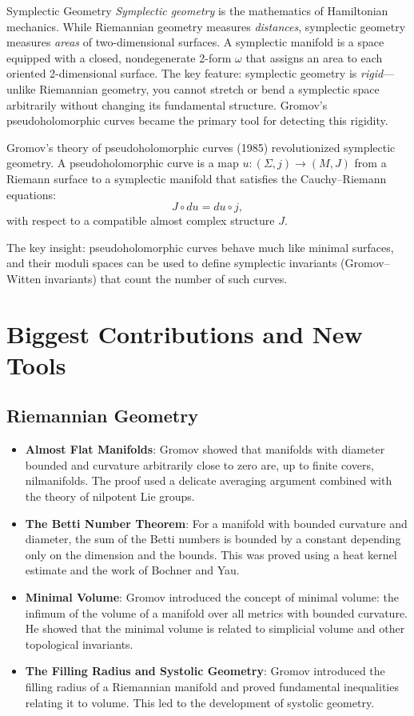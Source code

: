 \begin{primer}{Symplectic Geometry}
\emph{Symplectic geometry} is the mathematics of Hamiltonian mechanics. While Riemannian geometry measures \emph{distances}, symplectic geometry measures \emph{areas} of two-dimensional surfaces. A symplectic manifold is a space equipped with a closed, nondegenerate 2-form $\omega$ that assigns an area to each oriented 2-dimensional surface. The key feature: symplectic geometry is \emph{rigid}---unlike Riemannian geometry, you cannot stretch or bend a symplectic space arbitrarily without changing its fundamental structure. Gromov's pseudoholomorphic curves became the primary tool for detecting this rigidity.
\end{primer}

Gromov's theory of pseudoholomorphic curves (1985) revolutionized symplectic geometry. A pseudoholomorphic curve is a map $u: (\Sigma, j) \to (M, J)$ from a Riemann surface to a symplectic manifold that satisfies the Cauchy--Riemann equations:
\[
J \circ du = du \circ j,
\]
with respect to a compatible almost complex structure $J$.

The key insight: pseudoholomorphic curves behave much like minimal surfaces, and their moduli spaces can be used to define symplectic invariants (Gromov--Witten invariants) that count the number of such curves.

\section{Biggest Contributions and New Tools}

\subsection{Riemannian Geometry}

\begin{itemize}
\item \textbf{Almost Flat Manifolds}: Gromov showed that manifolds with diameter bounded and curvature arbitrarily close to zero are, up to finite covers, nilmanifolds. The proof used a delicate averaging argument combined with the theory of nilpotent Lie groups.
\item \textbf{The Betti Number Theorem}: For a manifold with bounded curvature and diameter, the sum of the Betti numbers is bounded by a constant depending only on the dimension and the bounds. This was proved using a heat kernel estimate and the work of Bochner and Yau.
\item \textbf{Minimal Volume}: Gromov introduced the concept of minimal volume: the infimum of the volume of a manifold over all metrics with bounded curvature. He showed that the minimal volume is related to simplicial volume and other topological invariants.
\item \textbf{The Filling Radius and Systolic Geometry}: Gromov introduced the filling radius of a Riemannian manifold and proved fundamental inequalities relating it to volume. This led to the development of systolic geometry.
\end{itemize}

